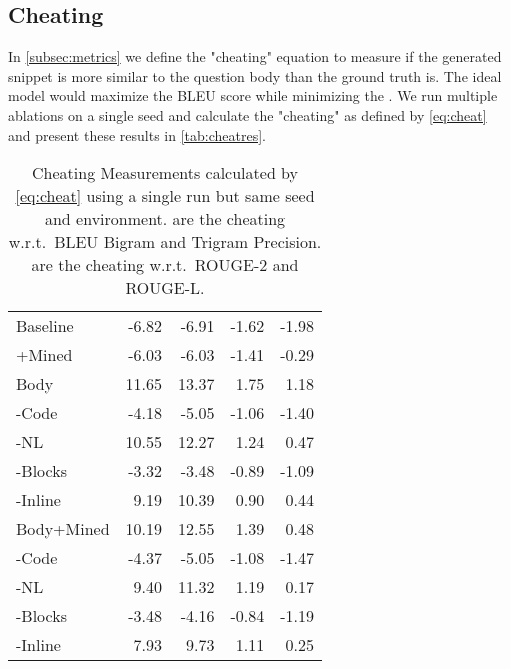 \documentclass[11pt]{article}
\newcommand*{\tableind}{\hspace*{0.5cm}}\newcommand{\thincross}{\textrm{\ding{61}}}
\begin{document}
\subsection{Cheating}
In \autoref{subsec:metrics} we define the "cheating" equation to measure if the generated snippet is more similar to the question body than the ground truth is. The ideal model would maximize the BLEU score while minimizing the . We run multiple ablations on a single seed and calculate the "cheating" as defined by \autoref{eq:cheat} and present these results in \autoref{tab:cheatres}.

\begin{table}[h]
    \centering
    \begin{tabular}{l|rrrr}
        \toprule
         & &&& \\
        \hline
        Baseline & -6.82& -6.91 & -1.62 & -1.98\\
        \tableind +Mined &-6.03&-6.03&-1.41&-0.29\\
        \hline
        Body  & 11.65 & 13.37 & 1.75 & 1.18 \\
        \tableind -Code & -4.18 & -5.05 & -1.06 & -1.40\\
        \tableind -NL & 10.55 & 12.27& 1.24 & 0.47 \\
        \tableind -Blocks &-3.32 & -3.48&-0.89&-1.09\\
        \tableind -Inline & 9.19& 10.39& 0.90 & 0.44\\
        \hline
        Body+Mined &10.19 & 12.55 &1.39 & 0.48\\
        \tableind -Code &-4.37 & -5.05&-1.08&-1.47\\
        \tableind -NL & 9.40&11.32&1.19 & 0.17\\
        \tableind -Blocks &-3.48 & -4.16&-0.84&-1.19\\
        \tableind -Inline & 7.93 & 9.73 & 1.11 & 0.25\\
    \end{tabular}
    \caption{Cheating Measurements calculated by \autoref{eq:cheat} using a single run but same seed and environment.  are the cheating w.r.t.~BLEU Bigram and Trigram Precision.  are the cheating w.r.t.~ROUGE-2 and ROUGE-L.}
    \label{tab:cheatres}
\end{table}
\end{document}
